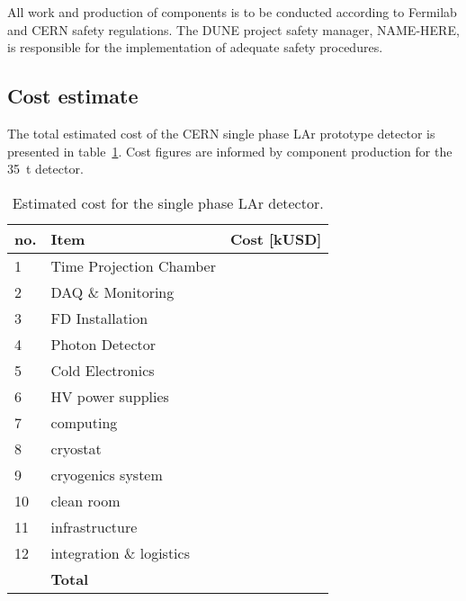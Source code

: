 All work and production of components is to be conducted according to Fermilab and CERN safety regulations. The DUNE project safety 
manager, NAME-HERE, is responsible for the implementation of adequate safety procedures.

\subsection{Cost estimate}
The total estimated cost of the CERN single phase LAr prototype detector is presented in table~\ref{tab:cost}.
Cost figures are informed by component production for the 35~t detector.

\begin{table}[h!]
\centering
\begin{tabular}{| l| l| c |}
\hline
\textbf{no. } & \textbf{Item}  & \textbf{Cost [kUSD]}  \\ \hline
1 & Time Projection Chamber & \\
2 & DAQ \& Monitoring  & \\
3 & FD Installation  &  \\
4 & Photon Detector  &  \\
5 & Cold Electronics &  \\
6 & HV power supplies & \\

7 & computing & \\
8 & cryostat &  \\   %
9 & cryogenics system &  \\  %
10 & clean room &  \\
11 & infrastructure & \\
12 & integration \& logistics & \\ \hline
  & \textbf{Total } & \\ \hline
\end{tabular}
\caption{Estimated cost for the single phase LAr detector.}
\label{tab:cost}
\end{table}






